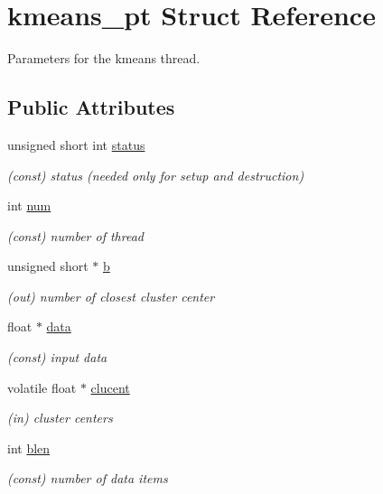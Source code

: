 \hypertarget{structkmeans__pt}{}\section{kmeans\+\_\+pt Struct Reference}
\label{structkmeans__pt}


Parameters for the kmeans thread.  


\subsection*{Public Attributes}
\begin{DoxyCompactItemize}
\item 
unsigned short int \mbox{\hyperlink{structkmeans__pt_adc9152bce7b95fd51d6185901169c52b}{status}}
\begin{DoxyCompactList}\small\item\em (const) status (needed only for setup and destruction) \end{DoxyCompactList}\item 
int \mbox{\hyperlink{structkmeans__pt_a72c17b986e5cc7bbdcc92d59ef05e8f0}{num}}
\begin{DoxyCompactList}\small\item\em (const) number of thread \end{DoxyCompactList}\item 
unsigned short $\ast$ \mbox{\hyperlink{structkmeans__pt_a00950024e02b55ade4be01f829f7f11d}{b}}
\begin{DoxyCompactList}\small\item\em (out) number of closest cluster center \end{DoxyCompactList}\item 
float $\ast$ \mbox{\hyperlink{structkmeans__pt_a6efb6f48fc6294152d77552f183704da}{data}}
\begin{DoxyCompactList}\small\item\em (const) input data \end{DoxyCompactList}\item 
volatile float $\ast$ \mbox{\hyperlink{structkmeans__pt_aca0bb922070f8b7dd1f0e82a4b8ca607}{clucent}}
\begin{DoxyCompactList}\small\item\em (in) cluster centers \end{DoxyCompactList}\item 
int \mbox{\hyperlink{structkmeans__pt_a4346d32e38a81feaf2799f25abf84a16}{blen}}
\begin{DoxyCompactList}\small\item\em (const) number of data items \end{DoxyCompactList}\item 

\end{DoxyCompactItemize}
